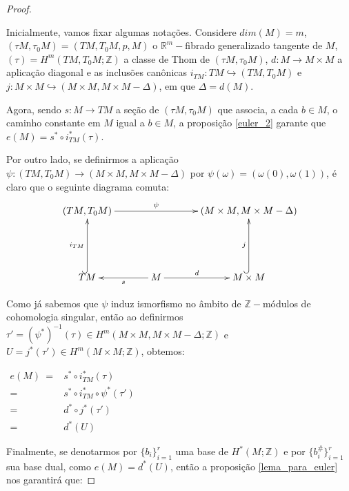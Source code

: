 \documentclass[12pt,oneside]{book} %
\newcommand{\R}{\mathbb{R}}
\newcommand{\Z}{\mathbb{Z}}
\begin{document}
\begin{proof}
	
	\
	
	\par Inicialmente, vamos fixar algumas notações. Considere $dim(M)=m$, $(\tau M,\tau_{0}M)=(TM,T_{0}M,p,M)$ o $\R^{m}-$fibrado generalizado tangente de $M$, $(\tau)=H^{m}(TM,T_{0}M;\Z)$ a classe de Thom de $(\tau M,\tau_{0}M)$, $d:M\to M\times M$ a aplicação diagonal e as inclusões canônicas $i_{TM}:TM\hookrightarrow (TM,T_{0}M)$ e $j:M\times M\hookrightarrow (M\times M,M\times M-\Delta)$, em que $\Delta=d(M)$.
	
	\par Agora, sendo $s:M\to TM$ a seção de $(\tau M,\tau_{0}M)$ que associa, a cada $b\in M$, o caminho constante em $M$ igual a $b\in M$, a proposição \ref{euler_2} garante que $e(M)=s^{*}\circ i_{TM}^{*}(\tau)$.
	
	\par Por outro lado, se definirmos a aplicação $\psi:(TM,T_{0}M)\to (M\times M,M\times M-\Delta)$ por $\psi(\omega)=(\omega(0),\omega(1))$, é claro que o seguinte diagrama comuta:
	$$ \xymatrix @C=0.5cm {
		(TM,T_{0}M) \ar[rrrr]^-{\psi} &&&& (M\times M,M\times M-\Delta) \\
		&&&& \\	
		TM \ar@{^(->}[uu]^-{i_{TM}} && M \ar[ll]^-{s} \ar[rr]^-{d} && M\times M \ar@{^(->}[uu]^-{j} \\
	} $$
	
	\par Como já sabemos que $\psi$ induz ismorfismo no âmbito de $\Z-$módulos de cohomologia singular, então ao definirmos $\tau'=(\psi^{*})^{-1}(\tau)\in H^{m}(M\times M,M\times M-\Delta;\Z)$ e $U=j^{*}(\tau')\in H^{m}(M\times M;\Z)$, obtemos: \newline
	
	$ \begin{array}{rl}
		e(M) \ = & s^{*}\circ i_{TM}^{*}(\tau) \\
		= & s^{*}\circ i_{TM}^{*}\circ \psi^{*}(\tau') \\
		= & d^{*}\circ j^{*}(\tau') \\
		= & d^{*}(U)
	\end{array} $ \newline
	
	\par Finalmente, se denotarmos por $\{b_{i}\}_{i=1}^{r}$ uma base de $H^{*}(M;\Z)$ e por $\{b_{i}^{\#}\}_{i=1}^{r}$ sua base dual, como $e(M)=d^{*}(U)$, então a proposição \ref{lema_para_euler} nos garantirá que: \newline
	

\end{proof}
\end{document}
